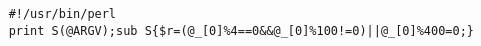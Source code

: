\documentclass{article}
\begin{document}
   \begin{lstlisting}
	#!/usr/bin/perl
	print S(@ARGV);sub S{$r=(@_[0]%4==0&&@_[0]%100!=0)||@_[0]%400=0;}
   \end{lstlisting}
\end{document}
